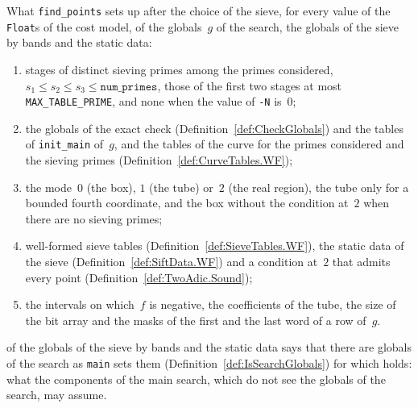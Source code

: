 \begin{definition}\label{def:IsSearchSetup}
  \leanok
  What \texttt{find\_points} sets up after the choice of the sieve, for every value of the
  \texttt{Float}s of the cost model,  of the globals~$g$ of the
  search, the globals of the sieve by bands and the static data:
  \begin{enumerate}
    \item stages of distinct sieving primes among the primes considered,
      $s_1 \le s_2 \le s_3 \le \texttt{num\_primes}$, those of the first two stages at most
      \texttt{MAX\_TABLE\_PRIME}, and none when the value of \texttt{-N} is~$0$;
    \item the globals of the exact check (Definition~\ref{def:CheckGlobals}) and the tables of
      \texttt{init\_main} of~$g$, and the tables of the curve for the primes considered and the
      sieving primes (Definition~\ref{def:CurveTables.WF});
    \item the mode~$0$ (the box), $1$ (the tube) or~$2$ (the real region), the tube only for a
      bounded fourth coordinate, and the box without the condition at~$2$ when there are no
      sieving primes;
    \item well-formed sieve tables (Definition~\ref{def:SieveTables.WF}), the static data of the
      sieve (Definition~\ref{def:SiftData.WF}) and a condition at~$2$ that admits every point
      (Definition~\ref{def:TwoAdic.Sound});
    \item the intervals on which~$f$ is negative, the coefficients of the tube, the size of the
      bit array and the masks of the first and the last word of a row of~$g$.
  \end{enumerate}
   of the globals of the sieve by bands and the static data says that
  there are globals of the search as \texttt{main} sets them (Definition~\ref{def:IsSearchGlobals})
  for which  holds: what the components of the main search, which do
  not see the globals of the search, may assume.
\end{definition}


